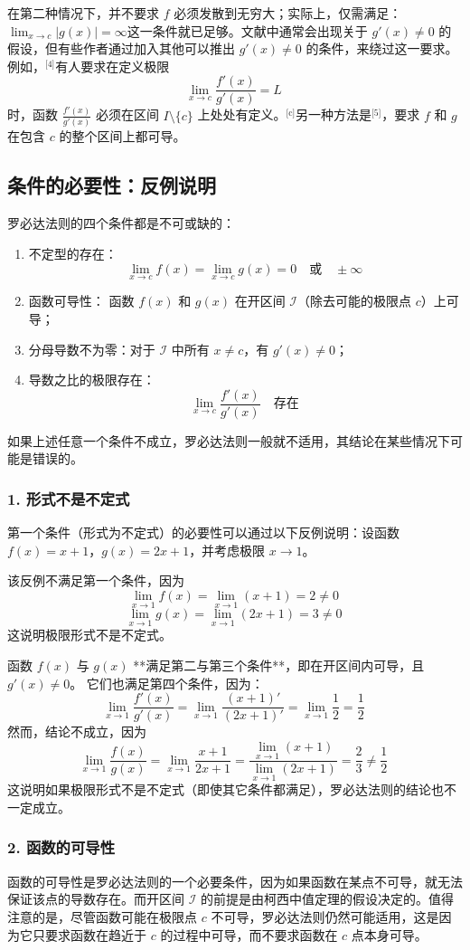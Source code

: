 在第二种情况下，并不要求 $f$ 必须发散到无穷大；实际上，仅需满足：$\lim_{x \to c} |g(x)| = \infty$这一条件就已足够。文献中通常会出现关于 $g'(x) \ne 0$ 的假设，但有些作者通过加入其他可以推出 $g'(x) \ne 0$ 的条件，来绕过这一要求。例如，\(^\text{[4]}\)有人要求在定义极限
$$
\lim_{x \to c} \frac{f'(x)}{g'(x)} = L~
$$
时，函数 $\frac{f'(x)}{g'(x)}$ 必须在区间 $I \setminus \{c\}$ 上处处有定义。\(^\text{[c]}\)另一种方法是\(^\text{[5]}\)，要求 $f$ 和 $g$ 在包含 $c$ 的整个区间上都可导。
\subsection{条件的必要性：反例说明}
罗必达法则的四个条件都是不可或缺的：
\begin{enumerate}
\item 不定型的存在：
   $$
   \lim_{x \to c} f(x) = \lim_{x \to c} g(x) = 0 \quad \text{或} \quad \pm \infty~
   $$
\item 函数可导性：
   函数 $f(x)$ 和 $g(x)$ 在开区间 $\mathcal{I}$（除去可能的极限点 $c$）上可导；
\item 分母导数不为零：对于 $\mathcal{I}$ 中所有 $x \ne c$，有 $g'(x) \ne 0$；
\item 导数之比的极限存在：
   $$
   \lim_{x \to c} \frac{f'(x)}{g'(x)} \quad \text{存在}~
   $$
\end{enumerate}
如果上述任意一个条件不成立，罗必达法则一般就不适用，其结论在某些情况下可能是错误的。
\subsubsection{1. 形式不是不定式}
第一个条件（形式为不定式）的必要性可以通过以下反例说明：设函数$f(x) = x + 1$，$g(x) = 2x + 1$，并考虑极限 $x \to 1$。

该反例不满足第一个条件，因为
$$
\lim_{x \to 1} f(x) = \lim_{x \to 1} (x + 1) = 2 \neq 0~
$$
$$
\lim_{x \to 1} g(x) = \lim_{x \to 1} (2x + 1) = 3 \neq 0~
$$
这说明极限形式不是不定式。

函数 $f(x)$ 与 $g(x)$ **满足第二与第三个条件**，即在开区间内可导，且 $g'(x) \ne 0$。
它们也满足第四个条件，因为：
$$
\lim_{x \to 1} \frac{f'(x)}{g'(x)} = \lim_{x \to 1} \frac{(x + 1)'}{(2x + 1)'} =\lim_{x \to 1} \frac{1}{2} =\frac{1}{2}~
$$
然而，结论不成立，因为
$$
\lim_{x \to 1} \frac{f(x)}{g(x)} = \lim_{x \to 1} \frac{x + 1}{2x + 1} =\frac{\lim_{x \to 1}(x+1)}{\lim_{x \to 1}(2x+1)}= \frac{2}{3} \ne \frac{1}{2}~
$$
这说明如果极限形式不是不定式（即使其它条件都满足），罗必达法则的结论也不一定成立。
\subsubsection{2. 函数的可导性}
函数的可导性是罗必达法则的一个必要条件，因为如果函数在某点不可导，就无法保证该点的导数存在。而开区间 $\mathcal{I}$ 的前提是由柯西中值定理的假设决定的。值得注意的是，尽管函数可能在极限点 $c$ 不可导，罗必达法则仍然可能适用，这是因为它只要求函数在趋近于 $c$ 的过程中可导，而不要求函数在 $c$ 点本身可导。


